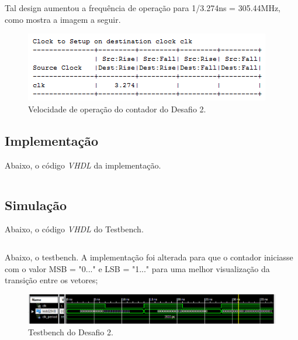 \documentclass[12pt]{article}
\begin{document}
Tal design aumentou a frequência de operação para 1/3.274ns = 305.44MHz, como mostra a imagem a seguir.

\begin{figure}[!h]
    \centering
    \includegraphics[width=.8\textwidth]{time_desafio2.png}
    \caption{Velocidade de operação do contador do Desafio 2.}
\end{figure}

\subsection{Implementação}

Abaixo, o código \emph{VHDL} da implementação.

\inputminted{vhdl}{desafio2.vhd}

\subsection{Simulação}

Abaixo, o código \emph{VHDL} do Testbench.

\inputminted{vhdl}{tb_desafio2.vhd}

Abaixo, o testbench. A implementação foi alterada para que o contador iniciasse com o valor MSB = "0..." e LSB = "1..." para uma melhor visualização da transição entre os vetores;

\begin{figure}[!h]
    \centering
    \includegraphics[width=1.0\textwidth]{tb_desafio2.png}
    \caption{Testbench do Desafio 2.}
\end{figure}
\end{document}
